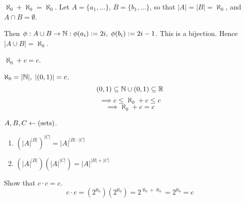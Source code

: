 \documentclass[12pt]{article}
\begin{document}
\bboxex
{} \(\aleph_0+\aleph_0=\aleph_0\). Let \(A=\{a_1,\dots\}\),
\(B=\{b_1,\dots\}\), so that \(|A|=|B|=\aleph_0\), and \(A\cap B=\emptyset\).

Then \(\phi:A\cup B\to\mathbb N:
\phi(a_i):=2i,\;
\phi(b_i):=2i-1\).
This is a bijection.
Hence
\(|A\cup B|=\aleph_0\).
\ebox

\bboxex
{} \(\aleph_0+c=c\).

\(\aleph_0=|\mathbb N|,\;|(0,1)|=c\).
\[(0,1)\subseteq\mathbb N\cup(0,1)
\subseteq\mathbb R\]
\[\implies c\le\aleph_0+c\le c\]
\[\implies \aleph_0+c=c\]
\ebox


\bbox
\begin{prop}
  \(A,B,C\leftarrow(\mathrm{sets})\).
  \begin{enumerate}
    \item \((|A|^{|B|})^{|C|}
      = |A|^{|B|\cdot|C|}\)
    \item \((|A|^{|B|})(|A|^{|C|})
      = |A|^{|B|+|C|}\)
  \end{enumerate}
\end{prop}
\ebox

\bboxex
{} Show that \(c\cdot c=c\).
\[c\cdot c=(2^{\aleph_0})(2^{\aleph_0})
=2^{\aleph_0+\aleph_0}=2^{\aleph_0}=c\]
\ebox


\end{document}
